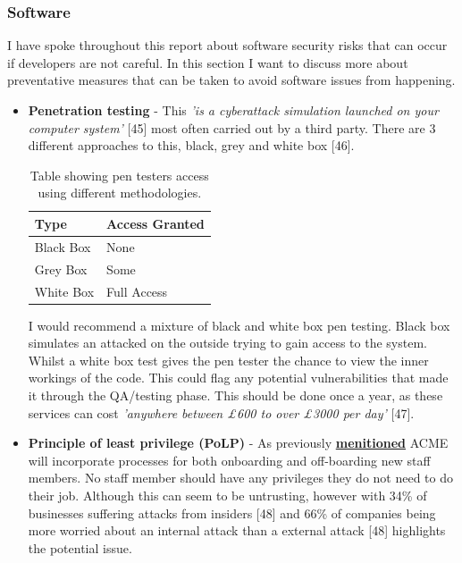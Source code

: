   \subsubsection{Software}
  I have spoke throughout this report about software security risks that can occur if developers are not careful. In this section I want to discuss
  more about preventative measures that can be taken to avoid software issues from happening.

  \begin{itemize}
    \item \textbf{Penetration testing} - This \textit{'is a cyberattack simulation launched on your computer system'} [45] most often carried out by a
    third party. There are 3 different approaches to this, black, grey and white box [46].

    \begin{table}[H]
      \centering
      \begin{tabular}{|l|l|}
        \hline
        \textbf{Type} & \textbf{Access Granted}   \\ \hline
        Black Box     & None                      \\ \hline
        Grey Box      & Some                      \\ \hline
        White Box     & Full Access               \\ \hline
      \end{tabular}
      \caption{Table showing pen testers access using different methodologies.}
    \end{table}

    I would recommend a mixture of black and white box pen testing. Black box simulates an attacked on the outside trying to gain access to the system.
    Whilst a white box test gives the pen tester the chance to view the inner workings of the code. This could flag any potential vulnerabilities that 
    made it through the QA/testing phase. This should be done once a year, as these services can cost 
    \textit{'anywhere between £600 to over £3000 per day'} [47].

    \item \textbf{Principle of least privilege (PoLP)} - As previously \hyperref[sec:PoLP]{\textbf{menitioned}} ACME will incorporate processes for 
    both onboarding and off-boarding new staff members. No staff member should have any privileges they do not need to do their job. Although this can seem 
    to be untrusting, however with 34\% of businesses suffering attacks from insiders [48] and 66\% of companies being more worried about an internal attack 
    than a external attack [48] highlights the potential issue.


\end{itemize}
